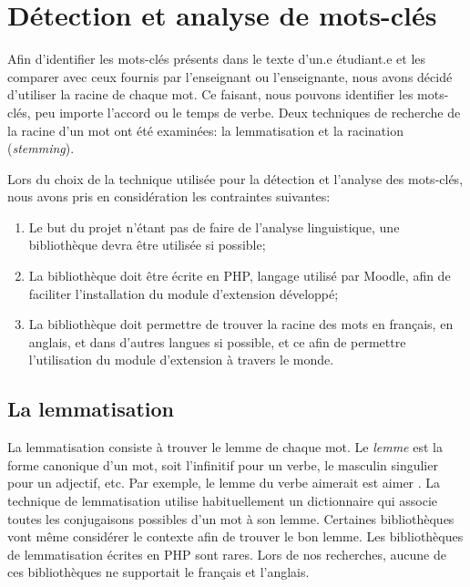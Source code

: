 \chapter{D\'etection et analyse de mots-cl\'es}
\label{chap:keywords}
Afin d'identifier les mots-cl\'es pr\'esents dans le texte d'un.e \'etudiant.e et les comparer avec ceux fournis par l'enseignant ou l'enseignante, nous avons d\'ecid\'e d'utiliser la racine de chaque mot.
Ce faisant, nous pouvons identifier les mots-cl\'es, peu importe l'accord ou le temps de verbe.
Deux techniques de recherche de la racine d'un mot ont \'et\'e examin\'ees: la lemmatisation et la racination (\textit{stemming}).

Lors du choix de la technique utilis\'ee pour la d\'etection et l'analyse des mots-cl\'es, nous avons pris en consid\'eration les contraintes suivantes:
\begin{enumerate}
  \item Le but du projet n'\'etant pas de faire de l'analyse linguistique, une biblioth\`eque devra \^etre utilis\'ee si possible;
  \item La biblioth\`eque doit \^etre \'ecrite en PHP, langage utilis\'e par Moodle, afin de faciliter l'installation du module d'extension d\'evelopp\'e;
  \item La biblioth\`eque doit permettre de trouver la racine des mots en fran\c{c}ais, en anglais, et dans d'autres langues si possible, et ce afin de permettre l'utilisation du module d'extension \`a travers le monde.
\end{enumerate}

\section{La lemmatisation}
La lemmatisation consiste \`a trouver le lemme de chaque mot.
Le \emph{lemme} est la forme canonique d'un mot, soit l'infinitif pour un verbe, le masculin singulier pour un adjectif, etc.
Par exemple, le lemme du verbe \og aimerait \fg{} est \og aimer \fg{}.
La  technique de lemmatisation utilise habituellement un dictionnaire qui associe toutes les conjugaisons possibles d'un mot \`a son lemme.
Certaines biblioth\`eques vont m\^eme consid\'erer le contexte afin de trouver le bon lemme.
Les biblioth\`eques de lemmatisation \'ecrites en PHP sont rares.
Lors de nos recherches, aucune de ces biblioth\`eques ne supportait le fran\c{c}ais et l'anglais.

